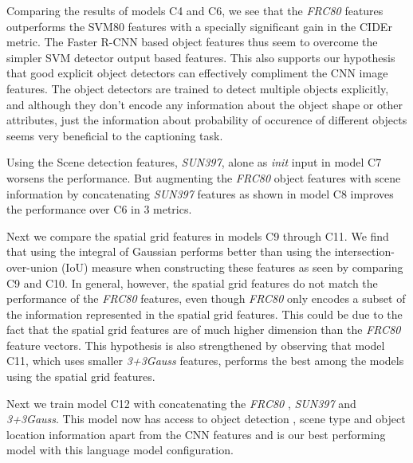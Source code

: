 Comparing the results of models C4 and C6, we see that the \emph{FRC80} features
outperforms the SVM80 features with a specially significant gain in the CIDEr
metric.
The Faster R-CNN based object features thus seem to overcome the simpler SVM
detector output based features.
This also supports our hypothesis that good explicit object detectors can
effectively compliment the CNN image features. 
The object detectors are trained to detect multiple objects explicitly, and
although they don't encode any information about the object shape or other
attributes, just the information about probability of occurence of different
objects seems very beneficial to the captioning task.

Using the Scene detection features, \emph{SUN397}, alone as \emph{init} input in
model C7 worsens the performance.
But augmenting the \emph{FRC80} object features with scene information by
concatenating \emph{SUN397} features as shown in model C8 improves the
performance over C6 in 3 metrics.

Next we compare the spatial grid features in models C9 through C11.
We find that using the integral of Gaussian performs better than using the
intersection-over-union (IoU) measure when constructing these features as seen
by comparing C9 and C10. 
In general, however, the spatial grid features do not match the performance of
the \emph{FRC80} features, even though \emph{FRC80} only encodes a subset of the
information represented in the spatial grid features.
This could be due to the fact that the spatial grid features are of much higher
dimension than the \emph{FRC80} feature vectors.
This hypothesis is also strengthened by observing that model C11, which uses
smaller \emph{3+3Gauss} features, performs the best among the models using the
spatial grid features.

Next we train model C12 with concatenating the \emph{FRC80} , \emph{SUN397}  and
\emph{3+3Gauss}. 
This model now has access to object detection , scene type and object location
information apart from the CNN features and is our best performing model with
this language model configuration.

